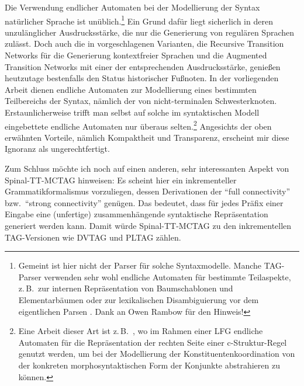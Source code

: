\largerpage
Die Verwendung endlicher Automaten bei der Modellierung der Syntax natürlicher Sprache ist unüblich.\footnote{Gemeint ist hier nicht der Parser für solche Syntaxmodelle. Manche TAG-Parser verwenden sehr wohl endliche Automaten für bestimmte Teilaspekte, z.\,B.\ zur internen Repräsentation von Baumschablonen und Elementarbäumen \citep{Nasr:Rambow:04} oder zur lexikalischen Disambiguierung vor dem eigentlichen Parsen \citep{Gardent:etal:14}. Dank an Owen Rambow für den Hinweis!} Ein Grund dafür liegt sicherlich in deren unzulänglicher Ausdrucksstärke, die nur die Generierung von regulären Sprachen zulässt. Doch auch die in \cite{Woods:70} vorgeschlagenen Varianten, die Recursive Transition Networks für die Generierung kontextfreier Sprachen und die Augmented Transition Networks mit einer der  entsprechenden Ausdrucksstärke, genie\ss en heutzutage bestenfalls den Status historischer Fu\ss noten. In der vorliegenden Arbeit dienen endliche Automaten zur Modellierung eines bestimmten Teilbereichs der Syntax, nämlich der  von nicht-terminalen Schwesterknoten. Erstaunlicherweise trifft man selbst auf solche im syntaktischen Modell eingebettete endliche Automaten nur überaus selten.\footnote{Eine Arbeit dieser Art ist z.\,B.\ \cite{Maxwell:Manning:96}, wo im Rahmen einer LFG endliche Automaten für die Repräsentation der rechten Seite einer c-Struktur-Regel genutzt werden, um bei der Modellierung der Konstituentenkoordination von der konkreten morphosyntaktischen Form der Konjunkte abstrahieren zu können.} Angesichts der oben erwähnten Vorteile, nämlich Kompaktheit und Transparenz, erscheint mir diese Ignoranz als ungerechtfertigt.

Zum Schluss möchte ich noch auf einen anderen, sehr interessanten Aspekt von Spinal-TT-MCTAG hinweisen: Es scheint hier ein inkrementeller Grammatikformalismus vorzuliegen, dessen Derivationen der "`full connectivity"' \citep{Sturt:Lombardo:05} bzw.\ "`strong connectivity"' \citep{Stabler:94} genügen. Das bedeutet, dass für jedes Präfix einer Eingabe eine (unfertige) zusammenhängende syntaktische Repräsentation generiert werden kann. Damit würde Spinal-TT-MCTAG zu den inkrementellen TAG-Versionen wie DVTAG \citep{Mazzei:etal:07} und PLTAG \citep{Demberg:Keller:08, Demberg:10} zählen. 


